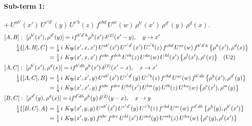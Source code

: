 \documentclass[10pt]{article}
\numberwithin{equation}{section}
\begin{document}
\paragraph{Sub-term 1:} $+\,U^{ab'}(x')\,U^{c'd'}(y)\,U^{c'b}(z)\,f^{cbd}\,U^{ac}(w)\,\rho^{b'}(x')\,\rho^{d'}(y)\,\rho^{d}(x)$.
\begin{align}
&[A,B]:\ [\rho^{b'}(x'),\rho^{d'}(y)]=i f^{b'd'h}\rho^{h}(x')\,\delta^{(2)}(x'-y),\quad y\to x'\notag\\
&\qquad \tfrac14\{[A,B],C\}=\tfrac14\,i\,\,K_{\mathfrak B}(x',x,x')\,U^{ab'}(x')\,U^{c'd'}(x')\,U^{c'b}(z)\,f^{cbd}\,U^{ac}(w)\,f^{b'd'h}\,\big\{\rho^{h}(x'),\rho^{d}(x)\big\}\notag\\
&\qquad\phantom{\tfrac14\{[A,B],C\}}=\tfrac14\,i\,\,K_{\mathfrak B}(x',x,x')\,f^{abc}\,f^{deh}\,U^{eb}(z)\,U^{da}(w)\,U^{hl}(x')\,\big\{\rho^{l}(x'),\rho^{c}(x)\big\}\quad\text{(U2)}
\label{R:eq:GIII.I-1-AB}\\
&[A,C]:\ [\rho^{b'}(x'),\rho^{d}(x)]=i f^{b'dh}\rho^{h}(x')\,\delta^{(2)}(x'-x),\quad x\to x'\notag\\
&\qquad \tfrac14\{[A,C],B\}=\tfrac14\,i\,\,K_{\mathfrak B}(x',x',y)\,U^{ab'}(x')\,U^{c'd'}(y)\,U^{c'b}(z)\,f^{cbd}\,U^{ac}(w)\,f^{b'dh}\,\big\{\rho^{h}(x'),\rho^{d'}(y)\big\}\notag\\
&\qquad\phantom{\tfrac14\{[A,C],B\}}=\tfrac14\,i\,\,K_{\mathfrak B}(x',x',y)\,f^{abc}\,f^{dce}\,U^{hd}(x')\,U^{lm}(y)\,U^{lb}(z)\,U^{ha}(w)\,\big\{\rho^{e}(x'),\rho^{m}(y)\big\}
\label{R:eq:GIII.I-1-AC}\\
&[B,C]:\ [\rho^{d'}(y),\rho^{d}(x)]=i f^{d'dh}\rho^{h}(y)\,\delta^{(2)}(y-x),\quad x\to y\notag\\
&\qquad \tfrac14\{[B,C],A\}=\tfrac14\,i\,\,K_{\mathfrak B}(x',y,y)\,U^{ab'}(x')\,U^{c'd'}(y)\,U^{c'b}(z)\,f^{cbd}\,U^{ac}(w)\,f^{d'dh}\,\big\{\rho^{h}(y),\rho^{b'}(x')\big\}\notag\\
&\qquad\phantom{\tfrac14\{[B,C],A\}}=\tfrac14\,i\,\,K_{\mathfrak B}(x',y,y)\,f^{abc}\,f^{dce}\,U^{hl}(x')\,U^{md}(y)\,U^{mb}(z)\,U^{ha}(w)\,\big\{\rho^{e}(y),\rho^{l}(x')\big\}
\label{R:eq:GIII.I-1-BC}
\end{align}
\end{document}
